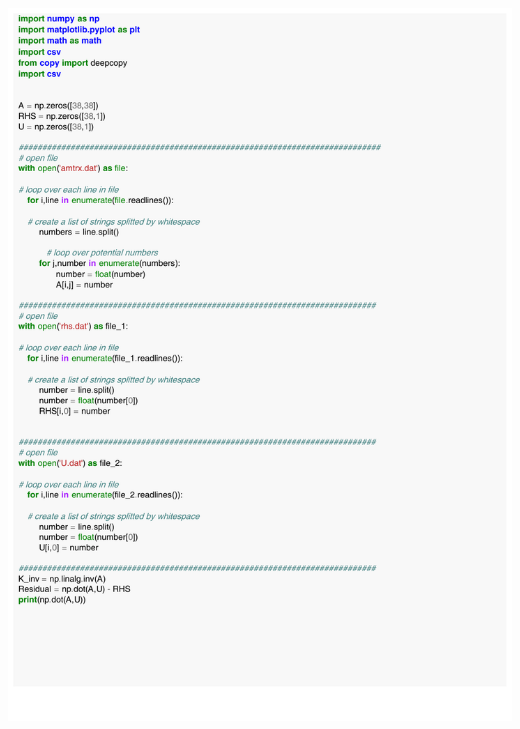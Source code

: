 \documentclass[12pt]{article}
\begin{document}
\begin{appendices}
\includegraphics[scale=0.80,page=1]{pro.pdf}

\end{appendices}
\end{document}
